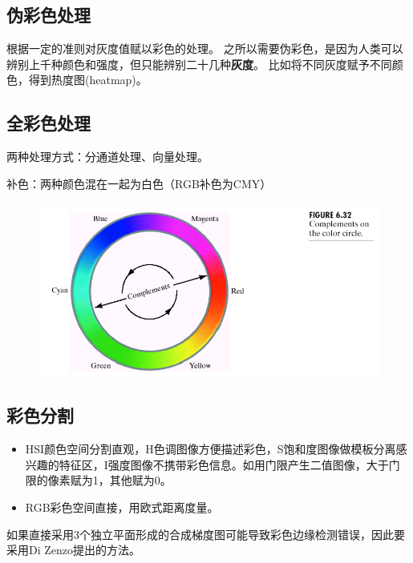 \subsection{伪彩色处理}
根据一定的准则对灰度值赋以彩色的处理。
之所以需要伪彩色，是因为人类可以辨别上千种颜色和强度，但只能辨别二十几种\textbf{灰度}。
比如将不同灰度赋予不同颜色，得到热度图(heatmap)。

\subsection{全彩色处理}
两种处理方式：分通道处理、向量处理。

补色：两种颜色混在一起为白色（RGB补色为CMY）
\begin{figure}[H]
\centering
\includegraphics[width=0.6\linewidth]{fig/complements.png}
\end{figure}

\subsection{彩色分割}
\begin{itemize}
	\item HSI颜色空间分割直观，H色调图像方便描述彩色，S饱和度图像做模板分离感兴趣的特征区，I强度图像不携带彩色信息。如用门限产生二值图像，大于门限的像素赋为1，其他赋为0。
	\item RGB彩色空间直接，用欧式距离度量。
\end{itemize}

如果直接采用3个独立平面形成的合成梯度图可能导致彩色边缘检测错误，因此要采用Di Zenzo提出的方法。